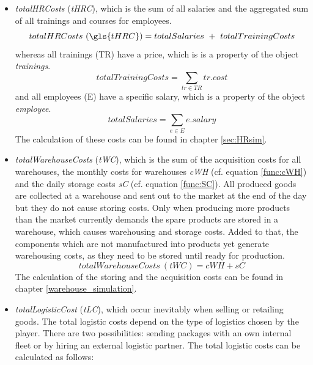 \begin{itemize}
    \item \textit{totalHRCosts} (\textit{tHRC}), which is the sum of all salaries and the aggregated sum of all trainings and courses for employees. 
    \begin{equation}
        totalHRCosts~(\gls{tHRC}) = totalSalaries \ + \  totalTrainingCosts
    \end{equation}
    whereas all trainings (\gls{TR}) have a price, which is is a property of the object \textit{trainings}.
    \begin{equation}
        totalTrainingCosts = \sum_{tr \in TR} tr.cost
    \end{equation}
    and all employees (\gls{E}) have a specific salary, which is a property of the object \textit{employee}.
     \begin{equation}
        totalSalaries = \sum_{e\in E} e.salary
    \end{equation}
    The calculation of these costs can be found in chapter \ref{sec:HRsim}.
    \item \textit{totalWarehouseCosts} (\textit{tWC}), which is the sum of the acquisition costs %
    for all warehouses, the monthly costs for warehouses \textit{cWH} (cf. equation \ref{func:cWH}) and the daily storage costs \textit{sC} (cf. equation \ref{func:SC}). All produced goods are collected at a warehouse and sent out to the market at the end of the day but they do not cause storing costs. Only when producing more products than the market currently demands the spare products are stored in a warehouse, which causes warehousing and storage costs. Added to that, the components which are not manufactured into products yet generate warehousing costs, as they need to be stored until ready for production. 
    \begin{equation}
        totalWarehouseCosts~(tWC) = cWH + sC
    \end{equation}
    The calculation of the storing and the acquisition costs can be found in chapter \ref{warehouse_simulation}. 
    \item \textit{totalLogisticCost} (\textit{tLC}), which occur inevitably when selling or retailing goods. The total logistic costs depend on the type of logistics chosen by the player. There are two possibilities: sending packages with an own internal fleet or by hiring an external logistic partner. The total logistic costs can be calculated as follows:
    \begin{equation} 

\end{equation}
\end{itemize}
